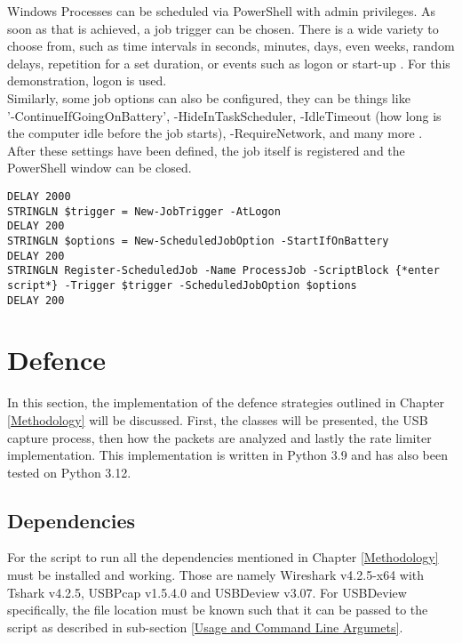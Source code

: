 Windows Processes can be scheduled via PowerShell with admin privileges. As soon as that is achieved, a job trigger can be chosen. There is a wide variety to choose from, such as time intervals in seconds, minutes, days, even weeks, random delays, repetition for a set duration, or events such as logon or start-up \cite{sdwheelerNewJobTriggerPSScheduledJobPowerShell}.
For this demonstration, logon is used. \\
Similarly, some job options can also be configured, they can be things like \\ '-ContinueIfGoingOnBattery', -HideInTaskScheduler, -IdleTimeout (how long is the computer idle before the job starts), -RequireNetwork, and many more \cite{sdwheelerSetScheduledJobOptionPSScheduledJobPowerShell}. \\
After these settings have been defined, the job itself is registered and the PowerShell window can be closed. \\


\begin{lstlisting}[caption={Excerpt: register a scheduled job via PowerShell}, captionpos=b]
DELAY 2000
STRINGLN $trigger = New-JobTrigger -AtLogon
DELAY 200
STRINGLN $options = New-ScheduledJobOption -StartIfOnBattery
DELAY 200
STRINGLN Register-ScheduledJob -Name ProcessJob -ScriptBlock {*enter script*} -Trigger $trigger -ScheduledJobOption $options
DELAY 200
\end{lstlisting}


\section{Defence}

In this section, the implementation of the defence strategies outlined in Chapter \ref{Methodology} will be discussed. First, the classes will be presented, the USB capture process, then how the packets are analyzed and lastly the rate limiter implementation. 
This implementation is written in Python 3.9 and has also been tested on Python 3.12.

\subsection{Dependencies}

For the script to run all the dependencies mentioned in Chapter \ref{Methodology} must be installed and working. Those are namely Wireshark v4.2.5-x64 with Tshark v4.2.5, USBPcap v1.5.4.0 and USBDeview v3.07. For USBDeview specifically, the file location must be known such that it can be passed to the script as described in sub-section \ref{Usage and Command Line Argumets}.



